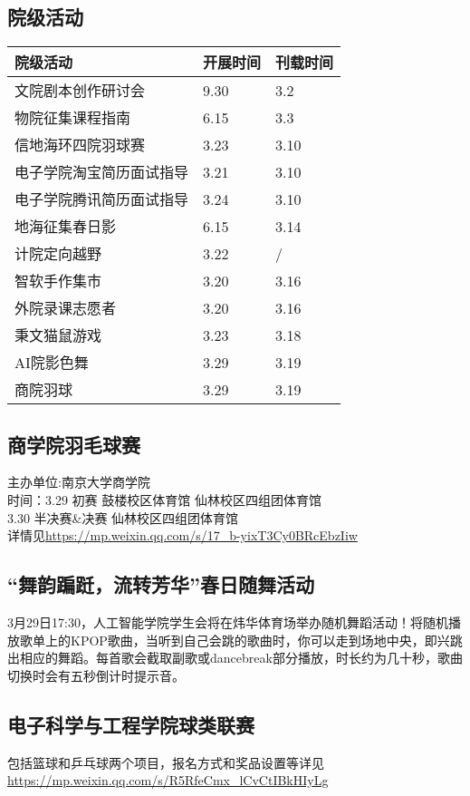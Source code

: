 \documentclass[letterpaper, 12pt]{article}
\begin{document}
\begin{multicols}{2}
\section{院级活动}
\begin{tabular}{|>{\centering\arraybackslash}m{}|m{}|m{}|}
    \hline
    院级活动 & 开展时间 & 刊载时间\\
    \hline\hline
    文院剧本创作研讨会 & 9.30 & 3.2\\
    物院征集课程指南 & 6.15 & 3.3\\
    信地海环四院羽球赛 & 3.23 & 3.10\\
    电子学院淘宝简历面试指导 & 3.21 & 3.10\\
    电子学院腾讯简历面试指导 & 3.24 & 3.10\\
    地海征集春日影 & 6.15 & 3.14\\
    计院定向越野 & 3.22 & / \\
    智软手作集市 & 3.20 & 3.16\\
    外院录课志愿者 & 3.20 & 3.16\\
    秉文猫鼠游戏 & 3.23 & 3.18\\
    AI院影色舞 & 3.29 & 3.19\\
    商院羽球 & 3.29 & 3.19\\
    \hline
\end{tabular}
\subsection{商学院羽毛球赛}
主办单位:南京大学商学院\\
时间：3.29 初赛 鼓楼校区体育馆 仙林校区四组团体育馆\\ 
3.30 半决赛\&决赛 仙林校区四组团体育馆\\
详情见\url{https://mp.weixin.qq.com/s/17_b-yixT3Cy0BRcEbzIiw}

\subsection{“舞韵蹁跹，流转芳华”春日随舞活动}
3月29日17:30，人工智能学院学生会将在炜华体育场举办随机舞蹈活动！将随机播放歌单上的KPOP歌曲，当听到自己会跳的歌曲时，你可以走到场地中央，即兴跳出相应的舞蹈。每首歌会截取副歌或dancebreak部分播放，时长约为几十秒，歌曲切换时会有五秒倒计时提示音。

\subsection{电子科学与工程学院球类联赛}
包括篮球和乒乓球两个项目，报名方式和奖品设置等详见\url{https://mp.weixin.qq.com/s/R5RfeCmx_lCvCtIBkHIyLg}


\end{multicols}
\end{document}
